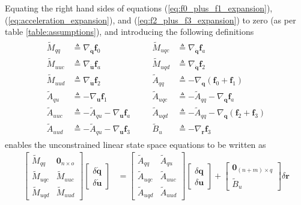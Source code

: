 \documentclass{svjour3}                     %
\begin{document}
Equating the right hand sides of equations (\ref{eq:f0_plus_f1_expansion}),
(\ref{eq:acceleration_expansion}),
and (\ref{eq:f2_plus_f3_expansion}) to zero (as per table
\ref{table:assumptions}), and introducing the following definitions
\begin{align}
    \begin{array}{llcll}
\tilde{M}_{qq}  &\triangleq \nabla_{\bm{\dot{q}}}\bm{f}_0 & \quad &
\tilde{M}_{uqc} &\triangleq \nabla_{\bm{\dot{q}}}\bm{f}_a \\
\tilde{M}_{uuc} &\triangleq \nabla_{\bm{\dot{u}}}\bm{f}_a & \quad &
\tilde{M}_{uqd} &\triangleq \nabla_{\bm{\dot{q}}}\bm{f}_2 \\
\tilde{M}_{uud} &\triangleq \nabla_{\bm{\dot{u}}}\bm{f}_2 & \quad &
\tilde{A}_{qq}  &\triangleq -\nabla_{\bm{q}}(\bm{f}_0 + \bm{f}_1) \\
\tilde{A}_{qu}  &\triangleq -\nabla_{\bm{u}}\bm{f}_1 & \quad &
\tilde{A}_{uqc} &\triangleq -\tilde{A}_{qq} - \nabla_{\bm{q}} \bm{f}_a \\
\tilde{A}_{uuc} &\triangleq -\tilde{A}_{qu} - \nabla_{\bm{u}} \bm{f}_a & \quad &
\tilde{A}_{uqd} &\triangleq -\tilde{A}_{qq} - \nabla_{\bm{q}} (\bm{f}_2 + \bm{f}_3) \\
\tilde{A}_{uud} &\triangleq -\tilde{A}_{qu} - \nabla_{\bm{u}} \bm{f}_3 & \quad &
\tilde{B}_{u}   &\triangleq -\nabla_{\bm{r}}\bm{f}_{3}
\end{array}
\end{align}
enables the unconstrained linear state space equations to be written as
\begin{align}
  \label{eq:state_space_unconstrained}
  \left[
    \begin{array}{cc}
      \tilde{M}_{qq} & \bm{0}_{n \times o} \\
      \tilde{M}_{uqc} & \tilde{M}_{uuc} \\
      \tilde{M}_{uqd} & \tilde{M}_{uud}
    \end{array}
    \right]
    \left[
      \begin{array}{c}
        \delta \bm{\dot{q}} \\
        \delta \bm{\dot{u}}
      \end{array}
    \right]
   &=
   \left[
     \begin{array}{cc}
       \tilde{A}_{qq} & \tilde{A}_{qu} \\
       \tilde{A}_{uqc} & \tilde{A}_{uuc} \\
       \tilde{A}_{uqd} & \tilde{A}_{uud}
     \end{array}
   \right]
    \left[
      \begin{array}{c}
        \delta \bm{q} \\
        \delta \bm{u}
      \end{array}
    \right]
    +
    \left[
      \begin{array}{c}
        \bm{0}_{(n + m) \times q} \\
        \tilde{B}_{u}
      \end{array}
    \right]
    \delta \bm{r}
\end{align}
\end{document}
